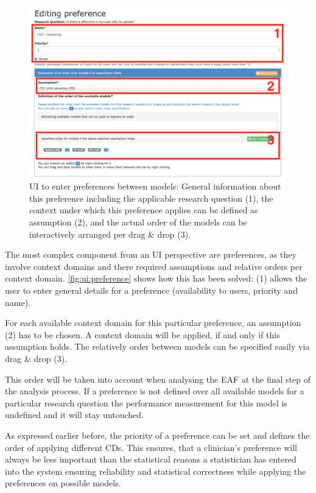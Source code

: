 \begin{figure}[htb]
	\centering
	\includegraphics[width=\textwidth]{figures/ui_preference}
	\caption{\Gls{UI} to enter preferences between models: General information about this preference including the applicable research question (1), the context under which this preference applies can be defined as assumption (2), and the actual order of the models can be interactively arranged per drag \& drop (3).}
	\label{fig:ui:preference}
\end{figure}


The most complex component from an \gls{UI} perspective are preferences, as they involve context domains and there required assumptions and relative orders per context domain. \autoref{fig:ui:preference} shows how this has been solved: (1) allows the user to enter general details for a preference (availability to users, priority and name). 

For each available context domain for this particular preference, an assumption (2) has to be chosen. A context domain will be applied, if and only if this assumption holds. The relatively order between models can be specified easily via drag \& drop (3). 

This order will be taken into account when analysing the \gls{EAF} at the final step of the analysis process. If a preference is not defined over all available models for a particular research question the performance measurement for this model is undefined and it will stay untouched.

As expressed earlier before, the priority of a preference can be set and defines the order of applying different \glspl{CD}. This ensures, that a clinician's preference will always be less important than the statistical reasons a statistician has entered into the system ensuring reliability and statistical correctness while applying the preferences on possible models.

